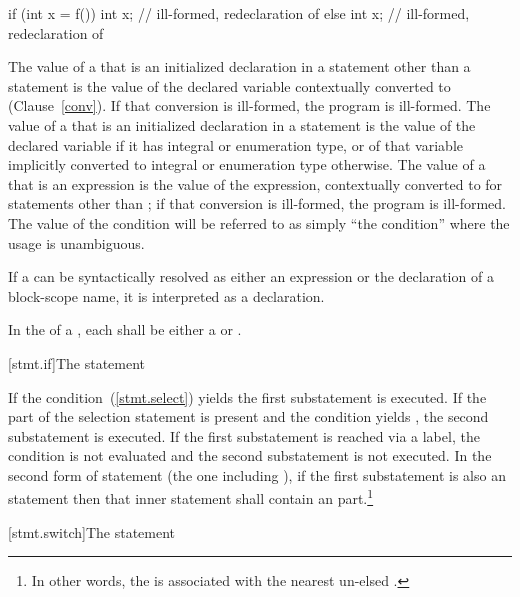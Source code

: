 \begin{codeblock}
if (int x = f()) {
  int x;            // ill-formed, redeclaration of 
}
else {
  int x;            // ill-formed, redeclaration of 
}
\end{codeblock}
\exitexample

\pnum
The value of a  that is an initialized declaration
in a statement other than a  statement is the value of the
declared variable
contextually converted to  (Clause~\ref{conv}).
If that
conversion is ill-formed, the program is ill-formed. The value of a
 that is an initialized declaration in a
 statement is the value of the declared variable if it has
integral or enumeration type, or of that variable implicitly converted
to integral or enumeration type otherwise. The value of a
 that is an expression is the value of the
expression, contextually converted to 
for statements other
than ;
if that conversion is ill-formed, the program is
ill-formed. The value of the condition will be referred to as simply
``the condition'' where the usage is unambiguous.

\pnum
If a  can be syntactically resolved as either an
expression or the declaration of a block-scope name, it is interpreted as a
declaration.

\pnum
In the  of a , each
 shall be either a 
or .

[stmt.if]{The  statement}%

\pnum
If the condition~(\ref{stmt.select}) yields  the first
substatement is executed. If the  part of the selection
statement is present and the condition yields , the second
substatement is executed. If the first substatement is reached via a
label, the condition is not evaluated and the second substatement is
not executed. In the second form of  statement
(the one including ), if the first substatement is also an
 statement then that inner  statement shall contain
an  part.\footnote{In other words, the  is associated with the nearest un-elsed
.}

[stmt.switch]{The  statement}%

